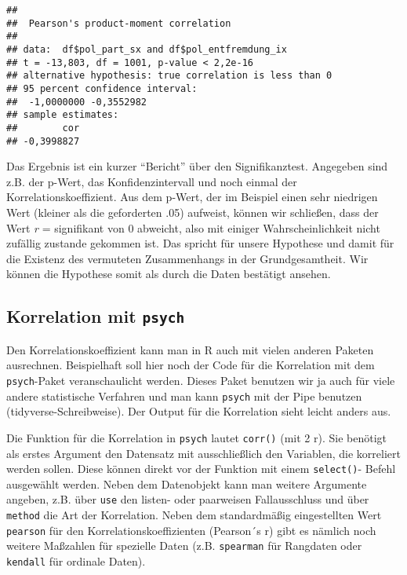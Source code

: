 \documentclass[
]{book}
\newenvironment{Shaded}{\begin{snugshade}}{\end{snugshade}}
\newcommand{\AttributeTok}[1]{\textcolor[rgb]{0.77,0.63,0.00}{#1}}
\newcommand{\FunctionTok}[1]{\textcolor[rgb]{0.00,0.00,0.00}{#1}}
\newcommand{\NormalTok}[1]{#1}
\newcommand{\SpecialCharTok}[1]{\textcolor[rgb]{0.00,0.00,0.00}{#1}}
\newcommand{\StringTok}[1]{\textcolor[rgb]{0.31,0.60,0.02}{#1}}
\begin{document}
\begin{Shaded}
\end{Shaded}

\begin{verbatim}
## 
##  Pearson's product-moment correlation
## 
## data:  df$pol_part_sx and df$pol_entfremdung_ix
## t = -13,803, df = 1001, p-value < 2,2e-16
## alternative hypothesis: true correlation is less than 0
## 95 percent confidence interval:
##  -1,0000000 -0,3552982
## sample estimates:
##        cor 
## -0,3998827
\end{verbatim}

Das Ergebnis ist ein kurzer ``Bericht'' über den Signifikanztest. Angegeben sind z.B. der p-Wert, das Konfidenzintervall und noch einmal der Korrelationskoeffizient. Aus dem p-Wert, der im Beispiel einen sehr niedrigen Wert (kleiner als die geforderten .05) aufweist, können wir schließen, dass der Wert \emph{r} =  signifikant von 0 abweicht, also mit einiger Wahrscheinlichkeit nicht zufällig zustande gekommen ist. Das spricht für unsere Hypothese und damit für die Existenz des vermuteten Zusammenhangs in der Grundgesamtheit. Wir können die Hypothese somit als durch die Daten bestätigt ansehen.

\hypertarget{korrelation-mit-psych}{%
\subsection{\texorpdfstring{Korrelation mit \texttt{psych}}{Korrelation mit psych}}\label{korrelation-mit-psych}}

Den Korrelationskoeffizient kann man in R auch mit vielen anderen Paketen ausrechnen. Beispielhaft soll hier noch der Code für die Korrelation mit dem \texttt{psych}-Paket veranschaulicht werden. Dieses Paket benutzen wir ja auch für viele andere statistische Verfahren und man kann \texttt{psych} mit der Pipe benutzen (tidyverse-Schreibweise). Der Output für die Korrelation sieht leicht anders aus.

Die Funktion für die Korrelation in \texttt{psych} lautet \texttt{corr()} (mit 2 r). Sie benötigt als erstes Argument den Datensatz mit ausschließlich den Variablen, die korreliert werden sollen. Diese können direkt vor der Funktion mit einem \texttt{select()}- Befehl ausgewählt werden. Neben dem Datenobjekt kann man weitere Argumente angeben, z.B. über \texttt{use} den listen- oder paarweisen Fallausschluss und über \texttt{method} die Art der Korrelation. Neben dem standardmäßig eingestellten Wert \texttt{pearson} für den Korrelationskoeffizienten (Pearson´s r) gibt es nämlich noch weitere Maßzahlen für spezielle Daten (z.B. \texttt{spearman} für Rangdaten oder \texttt{kendall} für ordinale Daten).
\end{document}
